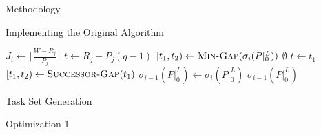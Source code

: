 \documentclass{article}
\begin{document}
\begin{section}{Methodology}
\begin{subsection}{Implementing the Original Algorithm}
    \begin{algorithm}[H]
      \caption{Gap-Tranformation Algorithm}\label{gapxfrm1}
      \begin{algorithmic}[2]
          \State $J_{i} \gets \lceil\frac{W - R_{j}}{P_{j}}\rceil$
            \State $t \gets R_{j} + P_{j}(q-1)$
            \State $[t_{1},t_{2}) \gets \Call{Min-Gap}{\sigma_{i}(P|_{0}^{L})}$
            \While{$[t_{1},t_{2}) \not= \Call{Nil}{\sigma_{i}(P|_{0}^{L})}$}
                \State \Return $\emptyset$
              \EndIf
                \State $t \gets t_{1}$
              \EndIf
                \State \Call{Gap-Delete}{$\sigma_{i}(P|_{0}^{L}), [t_{1},t_{2})$}
                  \State \Call{Gap-Insert}{$\sigma_{i}(P|_{0}^{L}), [t_{1},t)$}
                  \ExitWhile
                \EndIf
                  \State \Call{Gap-Insert}{$\sigma_{i}(P|_{0}^{L}), [t_{1},t)$}
                  \State \Call{Gap-Insert}{$\sigma_{i}(P|_{0}^{L}), [t + C_{j},t_{2})$}
                  \ExitWhile
                \EndIf
                  \State \Call{Gap-Insert}{$\sigma_{i}(P|_{0}^{L}), [t_{1},t)$}
                \EndIf                  
              \EndIf
              \State $[t_{1},t_{2}) \gets \Call{Successor-Gap}{t_{1}}$
            \EndWhile
          \EndFor
          \State $\sigma_{i-1}(P|_{0}^{L}) \gets \sigma_{i}(P|_{0}^{L})$
          \State \Return $\sigma_{i-1}(P|_{0}^{L})$
        \EndFunction
      \end{algorithmic}
      \end{algorithm}
        
  \end{subsection}

  \begin{subsection}{Task Set Generation}
  \end{subsection}

  \begin{subsection}{Optimization 1}


\end{subsection}
\end{section}
\end{document}
